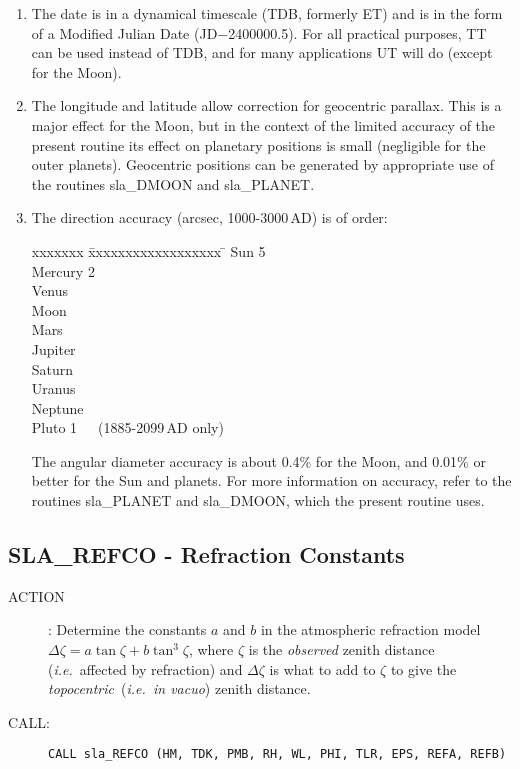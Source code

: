 \documentclass[11pt,twoside]{article}
\newcommand{\xlabel}[1]{}
\newcommand{\routine}[3]
{\hbadness=10000
  \vbox
  {
    \rule{\textwidth}{0.3mm}\\
    {\Large {\bf #1} \hfill #2 \hfill {\bf #1}}\\
    \setlength{\oldspacing}{\topsep}
    \setlength{\topsep}{0.3ex}
    \begin{description}
      #3
    \end{description}
    \setlength{\topsep}{\oldspacing}
  }
}
\renewcommand{\routine}[3]
   {
      \subsection{#1\xlabel{#1} - #2\label{#1}}
       \begin{description}
         #3
       \end{description}
   }
\newcommand{\action}[1]
{\item[ACTION]: #1}
\newcommand{\action}[1]
   {\item[ACTION:] #1}
\newcommand{\call}[1]
{\item[CALL]: \hspace{0.4em}{\tt #1}}
\newlength{\oldspacing}
\renewcommand{\call}[1]
   {
    \item[CALL:] {\tt #1}
   }
\begin{document}
{
 \begin{enumerate}
  \item The date is in a dynamical timescale (TDB, formerly ET)
        and is in the form of a Modified
        Julian Date (JD$-$2400000.5).  For all practical purposes, TT can
        be used instead of TDB, and for many applications UT will do
        (except for the Moon).
  \item The longitude and latitude allow correction for geocentric
        parallax.  This is a major effect for the Moon, but in the
        context of the limited accuracy of the present routine its
        effect on planetary positions is small (negligible for the
        outer planets).  Geocentric positions can be generated by
        appropriate use of the routines sla\_DMOON and sla\_PLANET.
  \item The direction accuracy (arcsec, 1000-3000\,AD) is of order:
        \begin{tabbing}
         xxxxxxx \= xxxxxxxxxxxxxxxxxx \= \kill
         \> Sun     \>  \hspace{0.5em}5 \\
         \> Mercury \>  \hspace{0.5em}2 \\
         \> Venus    \\
         \> Moon     \\
         \> Mars     \\
         \> Jupiter  \\
         \> Saturn   \\
         \> Uranus   \\
         \> Neptune  \\
         \> Pluto \> \hspace{0.5em}1~~~(1885-2099\,AD only)
        \end{tabbing}
        The angular diameter accuracy is about 0.4\% for the Moon,
        and 0.01\% or better for the Sun and planets.
        For more information on accuracy,
        refer to the routines sla\_PLANET and sla\_DMOON,
        which the present routine uses.
 \end{enumerate}
}
\routine{SLA\_REFCO}{Refraction Constants}
{
 \action{Determine the constants $a$ and $b$ in the
         atmospheric refraction model
         $\Delta \zeta = a \tan \zeta + b \tan^{3} \zeta$,
         where $\zeta$ is the {\it observed}\/ zenith distance
         ({\it i.e.}\ affected by refraction) and $\Delta \zeta$ is
         what to add to $\zeta$ to give the {\it topocentric}\,
         ({\it i.e.\ in vacuo}) zenith distance.}
 \call{CALL sla\_REFCO (HM, TDK, PMB, RH, WL, PHI, TLR, EPS, REFA, REFB)}
}
\end{document}
